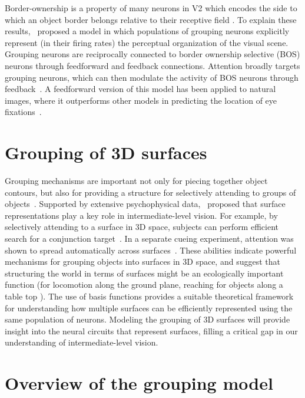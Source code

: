 Border-ownership is a property of many neurons in V2 which encodes the side to which an object border belongs relative to their receptive field \citep{Zhou_etal00}. To explain these results,~\citet{Craft_etal07} proposed a model in which populations of grouping neurons explicitly represent (in their firing rates) the perceptual organization of the visual scene. Grouping neurons are reciprocally connected to border ownership selective (BOS) neurons through feedforward and feedback connections. Attention broadly targets grouping neurons, which can then modulate the activity of BOS neurons through feedback~\citep{Mihalas_etal11b}. A feedforward version of this model has been applied to natural images, where it outperforms other models in predicting the location of eye fixations~\citep{Russell_etal14}.

\section{Grouping of 3D surfaces}
Grouping mechanisms are important not only for piecing together object contours, but also for providing a structure for selectively attending
to groups of objects~\citep{Treisman_Gelade80}. Supported by extensive psychophysical data,~\citet*{Nakayama_etal95} proposed that surface
representations play a key role in intermediate-level vision. For example, by selectively attending to a surface in 3D space, subjects can perform efficient search for a conjunction target~\citep{Nakayama_Silverman86}. In a separate cueing experiment, attention was shown to spread automatically across surfaces~\citep{He_Nakayama95}. These abilities indicate powerful mechanisms for grouping objects into surfaces in 3D space, and suggest that structuring the world in terms of surfaces might be an ecologically important function (\eg for locomotion along the ground
plane, reaching for objects along a table top \etc). The use of basis functions provides a suitable theoretical framework for understanding how multiple surfaces can be efficiently represented using the same population of neurons. Modeling the grouping of 3D surfaces will provide insight into the neural circuits that represent surfaces, filling a critical gap in our understanding of intermediate-level vision.

\section{Overview of the grouping model}

